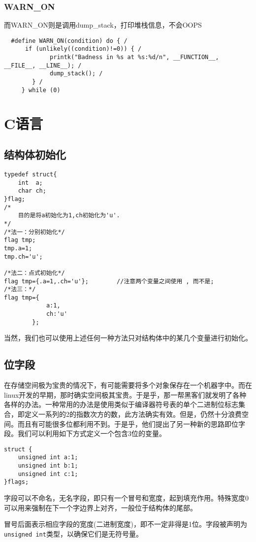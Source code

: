 			\subsubsection{WARN\_ON}			
    			而WARN\_ON则是调用dump\_stack，打印堆栈信息，不会OOPS
\begin{verbatim}
  #define WARN_ON(condition) do { /
      if (unlikely((condition)!=0)) { /
             printk("Badness in %s at %s:%d/n", __FUNCTION__, __FILE__, __LINE__); /
             dump_stack(); /
        } /
     } while (0)
\end{verbatim}

	\section{C语言}
		\subsection{结构体初始化}
\begin{verbatim}
typedef struct{
	int  a;
	char ch;
}flag;
/*
	目的是将a初始化为1,ch初始化为'u'.
*/
/*法一：分别初始化*/
flag tmp;
tmp.a=1;
tmp.ch='u';

/*法二：点式初始化*/
flag tmp={.a=1,.ch='u'};		//注意两个变量之间使用 , 而不是;
/*法三：*/
flag tmp={
			a:1,
			ch:'u'
		};
\end{verbatim}
			当然，我们也可以使用上述任何一种方法只对结构体中的某几个变量进行初始化。

		\subsection{位字段}
			在存储空间极为宝贵的情况下，有可能需要将多个对象保存在一个机器字中。而在linux开发的早期，那时确实空间极其宝贵。于是乎，那一帮黑客们就发明了各种各样的办法。一种常用的办法是使用类似于编译器符号表的单个二进制位标志集合，即定义一系列的2的指数次方的数，此方法确实有效。但是，仍然十分浪费空间。而且有可能很多位都利用不到。于是乎，他们提出了另一种新的思路即位字段。我们可以利用如下方式定义一个包含3位的变量。

\begin{verbatim}
struct {
	unsigned int a:1;
	unsigned int b:1;
	unsigned int c:1;
}flags;
\end{verbatim}
			
			字段可以不命名，无名字段，即只有一个冒号和宽度，起到填充作用。特殊宽度0可以用来强制在下一个字边界上对齐，一般位于结构体的尾部。
			
			冒号后面表示相应字段的宽度(二进制宽度)，即不一定非得是1位。字段被声明为\texttt{unsigned int}类型，以确保它们是无符号量。

